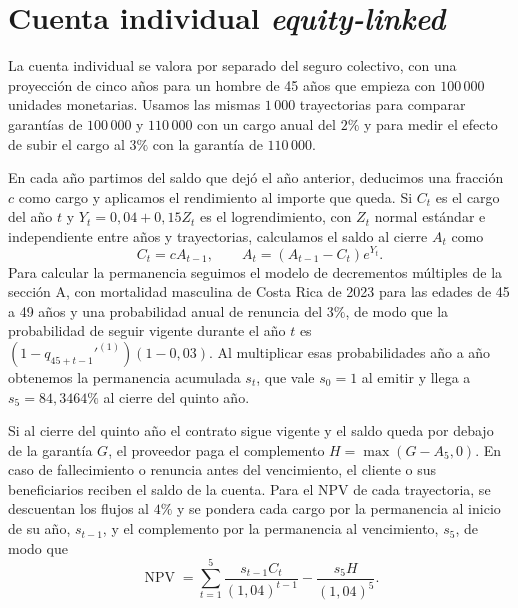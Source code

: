 \section{Cuenta individual \textit{equity-linked}}
\label{sec:equity-linked}

La cuenta individual se valora por separado del seguro colectivo, con una proyección de cinco años para un hombre de 45 años que empieza con $100\,000$ unidades monetarias. Usamos las mismas $1\,000$ trayectorias para comparar garantías de $100\,000$ y $110\,000$ con un cargo anual del $2\%$ y para medir el efecto de subir el cargo al $3\%$ con la garantía de $110\,000$.

En cada año partimos del saldo que dejó el año anterior, deducimos una fracción $c$ como cargo y aplicamos el rendimiento al importe que queda. Si $C_t$ es el cargo del año $t$ y $Y_t=0{,}04+0{,}15Z_t$ es el logrendimiento, con $Z_t$ normal estándar e independiente entre años y trayectorias, calculamos el saldo al cierre $A_t$ como
\[
    C_t=cA_{t-1},
    \qquad
    A_t=(A_{t-1}-C_t)e^{Y_t}.
\]
Para calcular la permanencia seguimos el modelo de decrementos múltiples de la sección A, con mortalidad masculina de Costa Rica de 2023 para las edades de 45 a 49 años y una probabilidad anual de renuncia del $3\%$, de modo que la probabilidad de seguir vigente durante el año $t$ es $(1-q_{45+t-1}'^{(1)})(1-0{,}03)$. Al multiplicar esas probabilidades año a año obtenemos la permanencia acumulada $s_t$, que vale $s_0=1$ al emitir y llega a $s_5=84{,}3464\%$ al cierre del quinto año.

Si al cierre del quinto año el contrato sigue vigente y el saldo queda por debajo de la garantía $G$, el proveedor paga el complemento $H=\max(G-A_5,0)$. En caso de fallecimiento o renuncia antes del vencimiento, el cliente o sus beneficiarios reciben el saldo de la cuenta. Para el NPV de cada trayectoria, se descuentan los flujos al $4\%$ y se pondera cada cargo por la permanencia al inicio de su año, $s_{t-1}$, y el complemento por la permanencia al vencimiento, $s_5$, de modo que
\[
    \operatorname{NPV}
    = \sum_{t=1}^{5}\frac{s_{t-1}C_t}{(1{,}04)^{t-1}}
    - \frac{s_5H}{(1{,}04)^5}.
\]

\begin{table}[htbp]
\centering
\small

\caption{Resultados por cuenta emitida en unidades monetarias, salvo las frecuencias. Elaboración propia.}
\label{tab:equity-comparacion}
\end{table}

